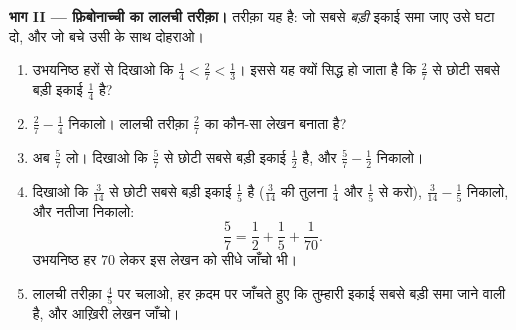 \begin{problem}
\medskip
\noindent\textbf{भाग II --- फ़िबोनाच्ची का लालची तरीक़ा।}
तरीक़ा यह है: जो सबसे \emph{बड़ी} इकाई  समा जाए उसे घटा दो, और
जो बचे उसी के साथ दोहराओ।
\begin{enumerate}[resume]
  \item उभयनिष्ठ हरों से दिखाओ कि $\frac14 < \frac27 < \frac13$।
        इससे यह क्यों सिद्ध हो जाता है कि $\frac27$ से छोटी सबसे
        बड़ी इकाई  $\frac14$ है?
  \item $\frac27 - \frac14$ निकालो। लालची तरीक़ा $\frac27$ का
        कौन-सा लेखन बनाता है?
  \item अब $\frac57$ लो। दिखाओ कि $\frac57$ से छोटी सबसे बड़ी इकाई
         $\frac12$ है, और $\frac57 - \frac12$ निकालो।
  \item दिखाओ कि $\frac{3}{14}$ से छोटी सबसे बड़ी इकाई 
        $\frac15$ है ($\frac{3}{14}$ की तुलना $\frac14$ और $\frac15$
        से करो), $\frac{3}{14} - \frac15$ निकालो, और नतीजा निकालो:
        \[
        \frac57 = \frac12 + \frac15 + \frac{1}{70} .
        \]
        उभयनिष्ठ हर $70$ लेकर इस लेखन को सीधे जाँचो भी।
  \item लालची तरीक़ा $\frac45$ पर चलाओ, हर क़दम पर जाँचते हुए कि
        तुम्हारी इकाई  सबसे बड़ी समा जाने वाली है, और आख़िरी
        लेखन जाँचो।
\end{enumerate}


\end{problem}
